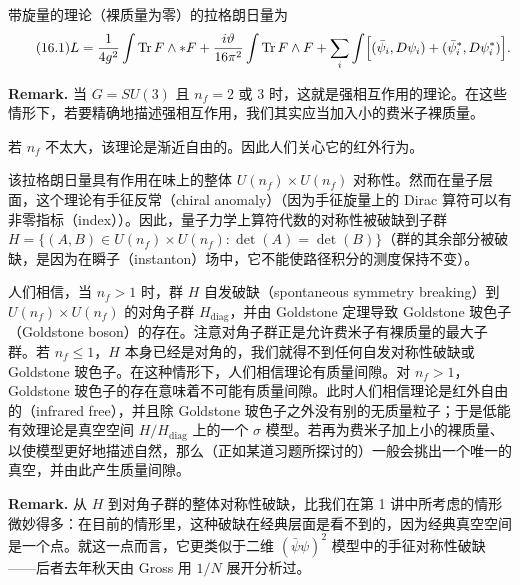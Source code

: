 带旋量的理论（裸质量为零）的拉格朗日量为
\begin{equation}
  \tag{16.1}
  \label{eq:16-1}
  L=\frac{1}{4g^2}\int\operatorname{Tr}F\wedge *F+\frac{i\vartheta}{16\pi^2}\int\operatorname{Tr}F\wedge F+\sum_i\int\Bigl[(\bar\psi_i,D\psi_i)+(\bar\psi_i^*,D\psi_i^*)\Bigr].
\end{equation}



\textbf{Remark.} 当 $G=SU(3)$ 且 $n_f=2$ 或 $3$ 时，这就是强相互作用的理论。在这些情形下，若要精确地描述强相互作用，我们其实应当加入小的费米子裸质量。

若 $n_f$ 不太大，该理论是渐近自由的。因此人们关心它的红外行为。

该拉格朗日量具有作用在味上的整体 $U(n_f)\times U(n_f)$ 对称性。然而在量子层面，这个理论有手征反常（chiral anomaly）（因为手征旋量上的 Dirac 算符可以有非零指标（index））。因此，量子力学上算符代数的对称性被破缺到子群 $H=\{(A,B)\in U(n_f)\times U(n_f):\det(A)=\det(B)\}$（群的其余部分被破缺，是因为在瞬子（instanton）场中，它不能使路径积分的测度保持不变）。

人们相信，当 $n_f>1$ 时，群 $H$ 自发破缺（spontaneous symmetry breaking）到 $U(n_f)\times U(n_f)$ 的对角子群 $H_{\mathrm{diag}}$，并由 Goldstone 定理导致 Goldstone 玻色子（Goldstone boson）的存在。注意对角子群正是允许费米子有裸质量的最大子群。若 $n_f\le1$，$H$ 本身已经是对角的，我们就得不到任何自发对称性破缺或 Goldstone 玻色子。在这种情形下，人们相信理论有质量间隙。对 $n_f>1$，Goldstone 玻色子的存在意味着不可能有质量间隙。此时人们相信理论是红外自由的（infrared free），并且除 Goldstone 玻色子之外没有别的无质量粒子；于是低能有效理论是真空空间 $H/H_{\mathrm{diag}}$ 上的一个 $\sigma$ 模型。若再为费米子加上小的裸质量、以使模型更好地描述自然，那么（正如某道习题所探讨的）一般会挑出一个唯一的真空，并由此产生质量间隙。

\textbf{Remark.} 从 $H$ 到对角子群的整体对称性破缺，比我们在第 1 讲中所考虑的情形微妙得多：在目前的情形里，这种破缺在经典层面是看不到的，因为经典真空空间是一个点。就这一点而言，它更类似于二维 $(\bar\psi\psi)^2$ 模型中的手征对称性破缺——后者去年秋天由 Gross 用 $1/N$ 展开分析过。


